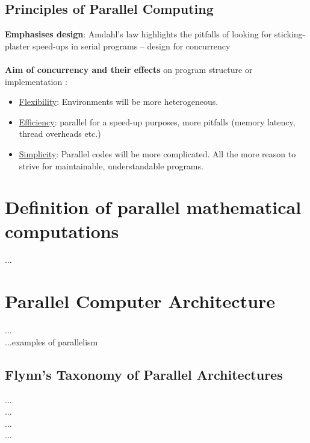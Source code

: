 \newpage

\subsection{Principles of Parallel Computing}

\textbf{Emphasises design}:
Amdahl's law highlights the pitfalls of looking for
sticking-plaster speed-ups in serial programs –
design for concurrency \parencite[see][p4]{article6}
\\\\\textbf{Aim of concurrency and their effects} on program structure or implementation \parencite[see][p5]{article6}:
\begin{itemize}
  \item \underline{Flexibility}: Environments will be more heterogeneous.
  \item \underline{Efficiency}:	parallel for a speed-up purposes, more pitfalls (memory latency, thread overheads etc.)
  \item \underline{Simplicity}:	Parallel codes will be more complicated. All the more reason to strive for maintainable, understandable programs.
\end{itemize}

\newpage

\section{Definition of parallel mathematical computations}


...\newpage

\section{Parallel Computer Architecture}

...\parencite[see][p9]{book1} \\
...examples of parallelism \parencite[see][p11]{book1}

\subsection{Flynn's Taxonomy of Parallel Architectures}

...\parencite[see][p5]{internet1}\\
...\parencite[see][p13]{book1}\\
...\parencite[see][p4]{book5}\\
...\parencite[see][p2]{book6}

